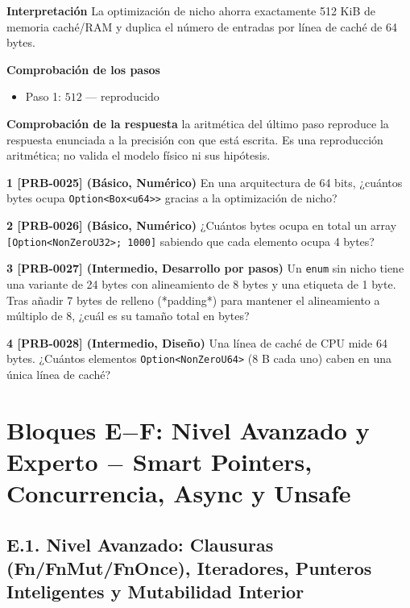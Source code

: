 \documentclass{book}
\begin{document}
\begin{tcolorbox}[title={Problema resuelto}, studiumworked, breakable]
\noindent\textbf{Interpretación}
La optimización de nicho ahorra exactamente 512 KiB de memoria caché/RAM y duplica el número de entradas por línea de caché de 64 bytes.

\noindent\textbf{Comprobación de los pasos}
\begin{itemize}
\item Paso 1: $512$ — reproducido
\end{itemize}

\noindent\textbf{Comprobación de la respuesta} la aritmética del último paso reproduce la respuesta enunciada a la precisión con que está escrita. Es una reproducción aritmética; no valida el modelo físico ni sus hipótesis.
\end{tcolorbox}

\begin{tcolorbox}[title={Ejercicios}, studiumworked, breakable]

\noindent\textbf{1 [PRB-0025] (Básico, Numérico)}
En una arquitectura de 64 bits, ¿cuántos bytes ocupa \texttt{Option<Box<u64>>} gracias a la optimización de nicho?

\noindent\textbf{2 [PRB-0026] (Básico, Numérico)}
¿Cuántos bytes ocupa en total un array \texttt{[Option<NonZeroU32>; 1000]} sabiendo que cada elemento ocupa 4 bytes?

\noindent\textbf{3 [PRB-0027] (Intermedio, Desarrollo por pasos)}
Un \texttt{enum} sin nicho tiene una variante de 24 bytes con alineamiento de 8 bytes y una etiqueta de 1 byte. Tras añadir 7 bytes de relleno (*padding*) para mantener el alineamiento a múltiplo de 8, ¿cuál es su tamaño total en bytes?

\noindent\textbf{4 [PRB-0028] (Intermedio, Diseño)}
Una línea de caché de CPU mide 64 bytes. ¿Cuántos elementos \texttt{Option<NonZeroU64>} (8 B cada uno) caben en una única línea de caché?
\end{tcolorbox}

\part{Bloques E\(-\)F: Nivel Avanzado y Experto \(-\) Smart Pointers, Concurrencia, Async y Unsafe}

\chapter{E.1. Nivel Avanzado: Clausuras (Fn/FnMut/FnOnce), Iteradores, Punteros Inteligentes y Mutabilidad Interior}
\label{chap:cap05-closures-iteradores-smart-pointers-mutabilidad-interior}
\end{document}
